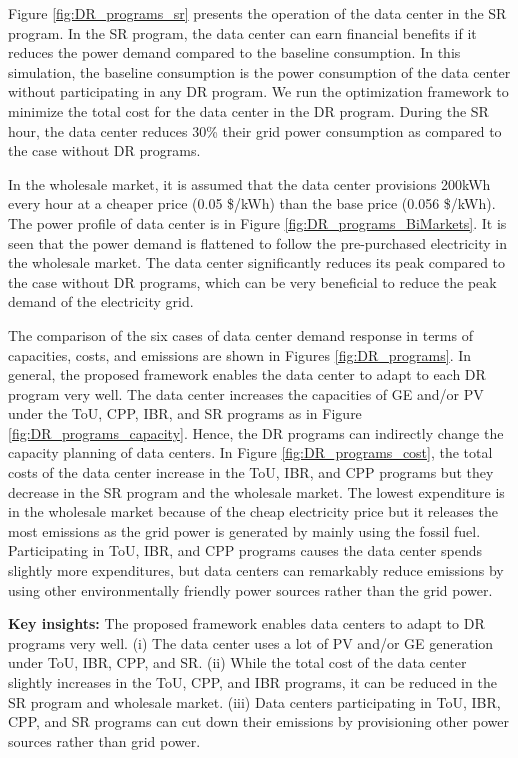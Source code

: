 Figure \ref{fig:DR_programs_sr} presents the operation of the data center in the SR program. In the SR program, the data center can earn financial benefits if it reduces the power demand compared to the baseline consumption. In this simulation, the baseline consumption is the power consumption of the data center without participating in any DR program. We run the optimization framework to minimize the total cost for the data center in the DR program. During the SR hour, the data center reduces 30\% their grid power consumption as compared to the case without DR programs.

In the wholesale market, it is assumed that the data center provisions 200kWh every hour at a cheaper price (0.05 \$/kWh) than the base price (0.056 \$/kWh). The power profile of data center is in Figure \ref{fig:DR_programs_BiMarkets}. It is seen that the power demand is flattened to follow the pre-purchased electricity in the wholesale market. The data center significantly reduces its peak compared to the case without DR programs, which can be very beneficial to reduce the peak demand of the electricity grid.

The comparison of the six cases of data center demand response in terms of capacities, costs, and emissions are shown in Figures \ref{fig:DR_programs}. In general, the proposed framework enables the data center to adapt to each DR program very well. The data center increases the capacities of GE and/or PV under the ToU, CPP, IBR, and SR programs as in Figure \ref{fig:DR_programs_capacity}. Hence, the DR programs can indirectly change the capacity planning of data centers.
In Figure \ref{fig:DR_programs_cost}, the total costs of the data center increase in the ToU, IBR, and CPP programs but they decrease in the SR program and the wholesale market. The lowest expenditure is in the wholesale market because of the cheap electricity price but it releases the most emissions as the grid power is generated by mainly using the fossil fuel. Participating in ToU, IBR, and CPP programs causes the data center spends slightly more expenditures, but data centers can remarkably reduce emissions by using other environmentally friendly power sources rather than the grid power. 

\textbf{Key insights:} The proposed framework enables data centers to adapt to DR programs very well. (i) The data center uses a lot of PV and/or GE generation under ToU, IBR, CPP, and SR. (ii) While the total cost of the data center slightly increases in the ToU, CPP, and IBR programs, it can be reduced in the SR program and wholesale market. (iii) Data centers participating in ToU, IBR, CPP, and SR programs can cut down their emissions by provisioning other power sources rather than grid power.